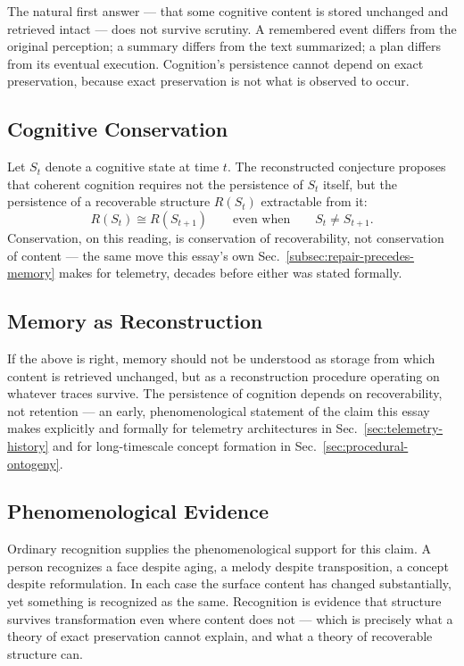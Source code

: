\documentclass[12pt,a4paper]{article}
\theoremstyle{plain}
\theoremstyle{definition}
\theoremstyle{remark}
\begin{document}
The natural first answer — that some cognitive content is stored unchanged and retrieved intact — does not survive scrutiny. A remembered event differs from the original perception; a summary differs from the text summarized; a plan differs from its eventual execution. Cognition's persistence cannot depend on exact preservation, because exact preservation is not what is observed to occur.

\subsection{Cognitive Conservation}
\label{subsec:phen-conservation}

Let $S_t$ denote a cognitive state at time $t$. The reconstructed conjecture proposes that coherent cognition requires not the persistence of $S_t$ itself, but the persistence of a recoverable structure $R(S_t)$ extractable from it:
\[
R(S_t) \cong R(S_{t+1}) \qquad \text{even when} \qquad S_t \neq S_{t+1}.
\]
Conservation, on this reading, is conservation of recoverability, not conservation of content — the same move this essay's own Sec.~\ref{subsec:repair-precedes-memory} makes for telemetry, decades before either was stated formally.

\subsection{Memory as Reconstruction}
\label{subsec:phen-memory-reconstruction}

If the above is right, memory should not be understood as storage from which content is retrieved unchanged, but as a reconstruction procedure operating on whatever traces survive. The persistence of cognition depends on recoverability, not retention — an early, phenomenological statement of the claim this essay makes explicitly and formally for telemetry architectures in Sec.~\ref{sec:telemetry-history} and for long-timescale concept formation in Sec.~\ref{sec:procedural-ontogeny}.

\subsection{Phenomenological Evidence}
\label{subsec:phen-evidence}

Ordinary recognition supplies the phenomenological support for this claim. A person recognizes a face despite aging, a melody despite transposition, a concept despite reformulation. In each case the surface content has changed substantially, yet something is recognized as the same. Recognition is evidence that structure survives transformation even where content does not — which is precisely what a theory of exact preservation cannot explain, and what a theory of recoverable structure can.
\end{document}
